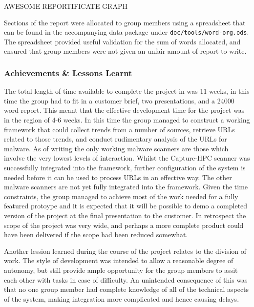 AWESOME REPORTIFICATE GRAPH

Sections of the report were allocated to group members using a spreadsheet that
can be found in the accompanying data package under
\verb`doc/tools/word-org.ods`. The spreadsheet provided useful validation for
the sum of words allocated, and ensured that group members were not given an
unfair amount of report to write.

\subsubsection{Achievements \& Lessons Learnt}

The total length of time available to complete the project in was 11 weeks, in
this time the group had to fit in a customer brief, two presentations, and a
24000 word report. This meant that the effective development time for the
project was in the region of 4-6 weeks. In this time the group managed to
construct a working framework that could collect trends from a number of
sources, retrieve URLs related to those trends, and conduct rudimentary analysis
of the URLs for malware. As of writing the only working malware scanners are
those which involve the very lowest levels of interaction. Whilst the
Capture-HPC scanner was successfully integrated into the framework, further
configuration of the system is needed before it can be used to process URLs in
an effective way. The other malware scanners are not yet fully integrated into
the framework. Given the time constraints, the group managed to achieve most of
the work needed for a fully featured protoype and it is expected that it will be
possible to demo a completed version of the project at the final presentation to
the customer. In retrospect the scope of the project was very wide, and perhaps
a more complete product could have been delivered if the scope had been reduced
somewhat.

Another lession learned during the course of the project relates to the division
of work. The style of development was intended to allow a reasonable degree of
autonomy, but still provide ample opportunity for the group members to assit
each other with tasks in case of difficulty. An unintended consequence of this
was that no one group member had complete knowledge of all of the technical
aspects of the system, making integration more complicated and hence causing
delays.

